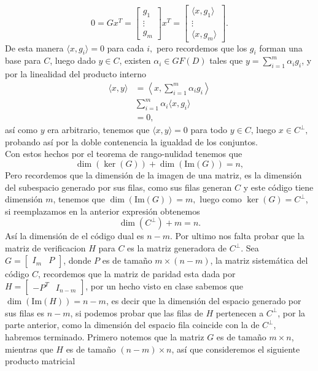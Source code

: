 \begin{sproof}
    $$0=Gx^T=\begin{bmatrix}
        g_1\\
    \vdots\\
    g_m
    \end{bmatrix}x^T=\begin{bmatrix}
        \langle x,g_1\rangle\\
        \vdots\\
        \langle x,g_m\rangle
    \end{bmatrix}.$$
    De esta manera $\langle x,g_i\rangle=0$ para cada $i,$ pero recordemos que los $g_i$ forman una base para $C$, luego dado $y\in C$, existen $\alpha_i\in GF(D)$ tales que $y=\sum_{i=1}^m\alpha_ig_i$, y por la linealidad del producto interno
    \begin{align*}
         \langle x,y\rangle&=\left\langle x,\sum_{i=1}^m\alpha_ig_i\right\rangle\\
         &\sum_{i=1}^m\alpha_i\langle x,g_i\rangle\\
         &=0,
     \end{align*}
     así como $y$ era arbitrario, tenemos que $\langle x,y\rangle=0$ para todo $y\in C$, luego $x\in C^\perp,$ probando así por la doble contenencia la igualdad de los conjuntos. \\
     Con estos hechos por el teorema de rango-nulidad tenemos que
     $$\dim(\ker(G))+\dim(\text{Im}(G))=n,$$
     Pero recordemos que la dimensión de la imagen de una matriz, es la dimensión del subespacio generado por sus filas, como sus filas generan $C$ y este código tiene dimensión $m$, tenemos que $\dim(\text{Im}(G))=m,$ luego como $\ker(G)=C^\perp$, si reemplazamos en la anterior expresión obtenemos
     $$\dim(C^\perp)+m=n.$$
     Así la dimensión de el código dual es $n-m.$
     Por ultimo nos falta probar que la matriz de verificacion $H$ para $C$ es la matriz generadora de $C^\perp.$ Sea $G=[\begin{array}{c|c}
         I_m& P
     \end{array}]$, donde $P$ es de tamaño $m\times (n-m)$, la matriz sistemática del código $C$, recordemos que la matriz de paridad esta dada por $H=[\begin{array}{c|c}
         -P^T& I_{n-m}
     \end{array}]$, por un hecho visto en clase sabemos que $\dim(\text{Im}(H))=n-m$, es decir que la dimensión del espacio generado por sus filas es $n-m$, si podemos probar que las filas de $H$ pertenecen a $C^\perp$, por la parte anterior, como la dimensión del espacio fila coincide con la de $C^\perp$, habremos terminado. Primero notemos que la matriz $G$ es de tamaño $m\times n$, mientras que $H$ es de tamaño $(n-m)\times n$, así que consideremos el siguiente producto matricial

\end{sproof}
